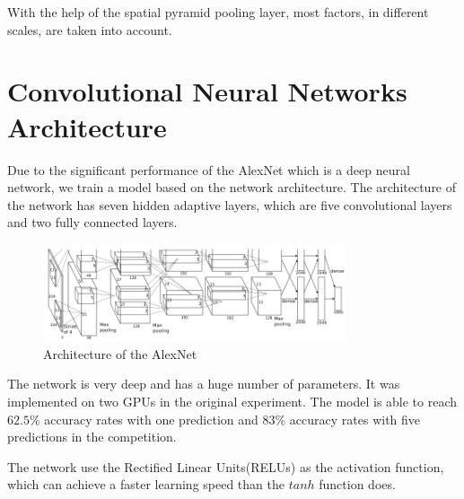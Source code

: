 With the help of the spatial pyramid pooling layer, most factors, in different scales, are taken into account.

\section{Convolutional Neural Networks Architecture}

Due to the significant performance of the AlexNet\citep{krizhevsky2012imagenet} which is a deep neural network, we train a model based on the network architecture. The architecture of the network has seven hidden adaptive layers, which are five convolutional layers and two fully connected layers.
\begin{figure}[htb]
    \centering
	\includegraphics[width=0.8\textwidth]{AlexNet.png}
    \caption{Architecture of the AlexNet}%
    \label{fig:ImageNetArch}%
\end{figure}
The network is very deep and has a huge number of parameters. It was implemented on two GPUs in the original experiment. The model is able to reach $62.5\%$ accuracy rates with one prediction and $83\%$ accuracy rates with five predictions in the competition.

The network use the Rectified Linear Units(RELUs)\citep{nair2010rectified} as the activation function, which can achieve a faster learning speed than the $tanh$ function does. 

